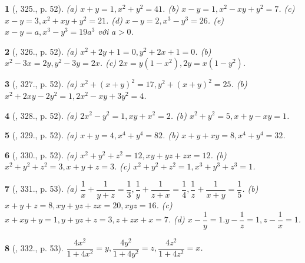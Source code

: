 \documentclass{article}
\newtheorem{baitoan}{}
\begin{document}
\begin{baitoan}[\cite{Binh_Toan_9_tap_2}, 325., p. 52]
	(a) $x + y = 1,x^2 + y^2 = 41$. (b) $x - y = 1,x^2 - xy + y^2 = 7$. (c) $x - y = 3,x^2 + xy + y^2 = 21$. (d) $x - y = 2,x^3 - y^3 = 26$. (e) $x - y = a,x^3 - y^3 = 19a^3$ với $a > 0$.
\end{baitoan}

\begin{baitoan}[\cite{Binh_Toan_9_tap_2}, 326., p. 52]
	(a) $x^2 + 2y + 1 = 0,y^2 + 2x + 1 = 0$. (b) $x^2 - 3x = 2y,y^2 - 3y = 2x$. (c) $2x = y(1 - x^2),2y = x(1 - y^2)$.
\end{baitoan}

\begin{baitoan}[\cite{Binh_Toan_9_tap_2}, 327., p. 52]
	(a) $x^2 + (x + y)^2 = 17,y^2 + (x + y)^2 = 25$. (b) $x^2 + 2xy - 2y^2 = 1,2x^2 - xy + 3y^2 = 4$.
\end{baitoan}

\begin{baitoan}[\cite{Binh_Toan_9_tap_2}, 328., p. 52]
	(a) $2x^2 - y^2 = 1,xy + x^2 = 2$. (b) $x^2 + y^2 = 5,x + y - xy = 1$.
\end{baitoan}

\begin{baitoan}[\cite{Binh_Toan_9_tap_2}, 329., p. 52]
	(a) $x + y = 4,x^4 + y^4 = 82$. (b) $x + y + xy = 8,x^4 + y^4 = 32$.
\end{baitoan}

\begin{baitoan}[\cite{Binh_Toan_9_tap_2}, 330., p. 52]
	(a) $x^2 + y^2 + z^2 = 12,xy + yz + zx = 12$. (b) $x^2 + y^2 + z^2 = 3,x + y + z = 3$. (c) $x^2 + y^2 + z^2 = 1,x^3 + y^3 + z^3 = 1$.
\end{baitoan}

\begin{baitoan}[\cite{Binh_Toan_9_tap_2}, 331., p. 53]
	(a) $\dfrac{1}{x} + \dfrac{1}{y + z} = \dfrac{1}{3},\dfrac{1}{y} + \dfrac{1}{z + x} = \dfrac{1}{4},\dfrac{1}{z} + \dfrac{1}{x + y} = \dfrac{1}{5}$. (b) $x + y + z = 8,xy + yz + zx = 20,xyz = 16$. (c) $x + xy + y = 1,y + yz + z = 3,z + zx + x = 7$. (d) $x - \dfrac{1}{y} = 1.y - \dfrac{1}{z} = 1,z - \dfrac{1}{x} = 1$.
\end{baitoan}

\begin{baitoan}[\cite{Binh_Toan_9_tap_2}, 332., p. 53]
	$\dfrac{4x^2}{1 + 4x^2} = y,\dfrac{4y^2}{1 + 4y^2} = z,\dfrac{4z^2}{1 + 4z^2} = x$.
\end{baitoan}
\end{document}
